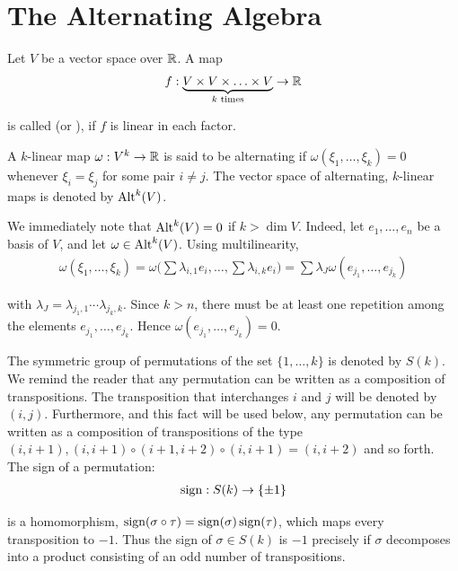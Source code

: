 \chapter{The Alternating Algebra}
Let $V$ be a vector space over ${\mathbb{R}}$. A map
\begin{align*}
  f: \underbrace{V\times V\times \ldots \times V}_{k\text{ times}} \to {\ensuremath{\mathbb{R}}}
\end{align*}

is called  (or ), if $f$ is linear in each factor.


\begin{definition}
  A $k$-linear map $\omega: V^k\to{\ensuremath{\mathbb{R}}}$ is said to be alternating if
  $\omega(\xi_1, \ldots, \xi_k) = 0$ whenever $\xi_i=\xi_j$ for some pair $i\neq j$. The vector space
  of alternating, $k$-linear maps is denoted by $\operatorname{Alt}^k(V)$.
\end{definition}


We immediately note that $\operatorname{Alt}^k(V) = 0$ if $k > \dim V$. Indeed, let $e_1, \ldots, e_n$ be a
basis of $V$, and let $\omega\in\operatorname{Alt}^k(V)$. Using multilinearity,
\begin{align*}
  \omega(\xi_{1},\ldots,\xi_{k})=\omega\Big(\sum\lambda_{i,1}e_{i},\ldots,\sum\lambda_{i,k}e_{i}\Big)=\sum\lambda_{J}\omega(e_{j_{1}},\ldots,e_{j_{k}})
\end{align*}


with $\lambda_J = \lambda_{j_1, 1}\cdots\lambda_{j_k, k}$. Since $k>n$, there must be at least one repetition
among the elements $e_{j_1}, \ldots, e_{j_k}$. Hence $\omega(e_{j_1}, \ldots, e_{j_k}) = 0$.

The symmetric group of permutations of the set $\{1, \ldots,k\}$ is denoted by $S(k)$.
We remind the reader that any permutation can be written as a composition of
transpositions. The transposition that interchanges $i$ and $j$ will be denoted by $(i, j)$.
Furthermore, and this fact will be used below, any permutation can be written as a
composition of transpositions of the type $(i, i+1), (i, i+1)\circ(i+1, i+2)\circ(i, i+1) =
  (i, i + 2)$ and so forth. The sign of a permutation:
\begin{align}\label{eq:2-1}
  \operatorname{sign}: S(k) \to \{\pm 1\}
\end{align}


is a homomorphism, $\operatorname{sign}(\sigma\circ\tau) = \operatorname{sign}(\sigma)\operatorname{sign}(\tau)$, which maps every
transposition to $-1$. Thus the sign of $\sigma\in S(k)$ is $-1$ precisely if $\sigma$ decomposes into a
product consisting of an odd number of transpositions.

